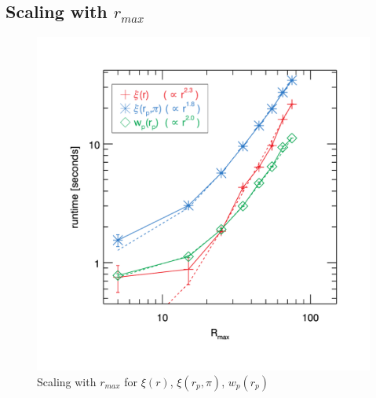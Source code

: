 \documentclass[preprint,authoryear,12pt]{elsarticle}
\newcommand{\rmax}{\ensuremath{{r_{max}}}\xspace}
\newcommand{\xir}{\ensuremath{{\xi(r)}}\xspace}
\newcommand{\wprp}{\ensuremath{{w_p(r_p)}}\xspace}
\newcommand{\xirppi}{\ensuremath{{\xi(r_p,\pi)}}\xspace}
\begin{document}
\subsection{Scaling with \rmax}
\begin{figure}[htbp]
\includegraphics[clip=true,width=\linewidth]{timings_Mr19_rmax}%
\caption{Scaling with \rmax for \xir, \xirppi, \wprp }
\label{fig:scaling_rmax}
\end{figure}
\end{document}
